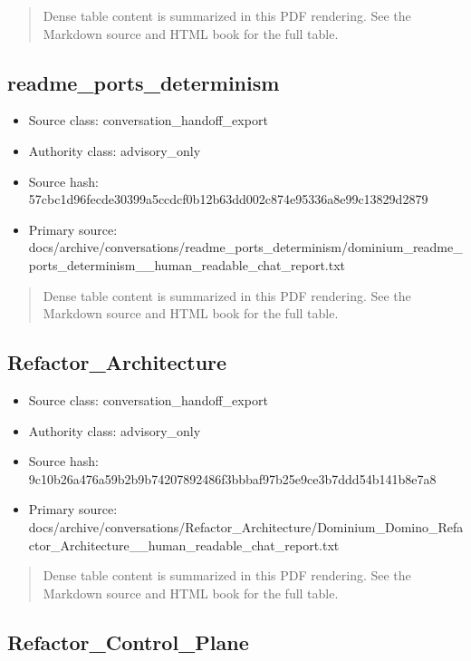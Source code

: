 \documentclass[11pt,a4paper]{report}
\begin{document}
\begin{quote}\small Dense table content is summarized in this PDF rendering. See the Markdown source and HTML book for the full table.\end{quote}

\subsection{readme\_ports\_determinism}

\begin{itemize}
\item Source class: conversation\_handoff\_export
\item Authority class: advisory\_only
\item Source hash: 57cbc1d96fecde30399a5ccdcf0b12b63dd002c874e95336a8e99c13829d2879
\item Primary source: docs/archive/conversations/readme\_ports\_determinism/dominium\_readme\_ports\_determinism\_\_human\_readable\_chat\_report.txt
\end{itemize}

\begin{quote}\small Dense table content is summarized in this PDF rendering. See the Markdown source and HTML book for the full table.\end{quote}

\subsection{Refactor\_Architecture}

\begin{itemize}
\item Source class: conversation\_handoff\_export
\item Authority class: advisory\_only
\item Source hash: 9c10b26a476a59b2b9b74207892486f3bbbaf97b25e9ce3b7ddd54b141b8e7a8
\item Primary source: docs/archive/conversations/Refactor\_Architecture/Dominium\_Domino\_Refactor\_Architecture\_\_human\_readable\_chat\_report.txt
\end{itemize}

\begin{quote}\small Dense table content is summarized in this PDF rendering. See the Markdown source and HTML book for the full table.\end{quote}

\subsection{Refactor\_Control\_Plane}
\end{document}
